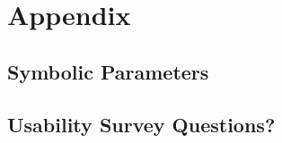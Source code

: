 \documentclass[12pt, titlepage]{article}
\begin{document}
\newpage

\section{Appendix}



\subsection{Symbolic Parameters}


\subsection{Usability Survey Questions?}

 
 
\end{document}
